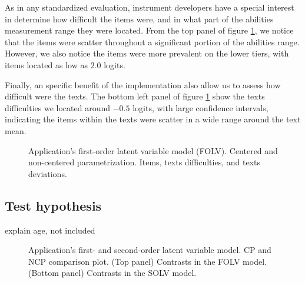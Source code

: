 As in any standardized evaluation, instrument developers have a special interest in determine how difficult the items were, and in what part of the abilities measurement range they were located. From the top panel of figure \ref{fig:FOLV_CE.NC_recovery}, we notice that the items were scatter throughout a significant portion of the abilities range. However, we also notice the items were more prevalent on the lower tiers, with items located as low as $2.0$ logits.

Finally, an specific benefit of the implementation also allow us to assess how difficult were the texts. The bottom left panel of figure \ref{fig:FOLV_CE.NC_recovery} show the texts difficulties we located around $-0.5$ logits, with large confidence intervals, indicating the items within the texts were scatter in a wide range around the text mean.
%
\begin{figure}[H]
	\centering
	\begin{subfigure}
		\texttt{[image: FOLV\_recovery\_items]}
	\end{subfigure}
	\begin{subfigure}
		\texttt{[image: FOLV\_recovery\_texts]}
	\end{subfigure}
	\caption[Application's first-order latent variable model (FOLV). Centered and non-centered parametrization. Items, and texts difficulties, and texts deviations.]%
	{Application's first-order latent variable model (FOLV). Centered and non-centered parametrization. Items, texts difficulties, and texts deviations.}
	\label{fig:FOLV_CE.NC_recovery}
\end{figure}



\subsection{Test hypothesis} \label{sect:test_hypothesis}

explain age, not included
%
\begin{figure}[H]
	\centering
	\begin{subfigure}
		\texttt{[image: FOLV\_recovery\_contrast]}
	\end{subfigure}
	\begin{subfigure}
		\texttt{[image: SOLV\_recovery\_contrast]}
	\end{subfigure}
%
	\caption[Application's first- and second-order latent variable model. CP and NCP comparison plot.]%
	{Application's first- and second-order latent variable model. CP and NCP comparison plot. (Top panel) Contrasts in the FOLV model. (Bottom panel) Contrasts in the SOLV model. }
	\label{fig:contrast_both}
\end{figure}






